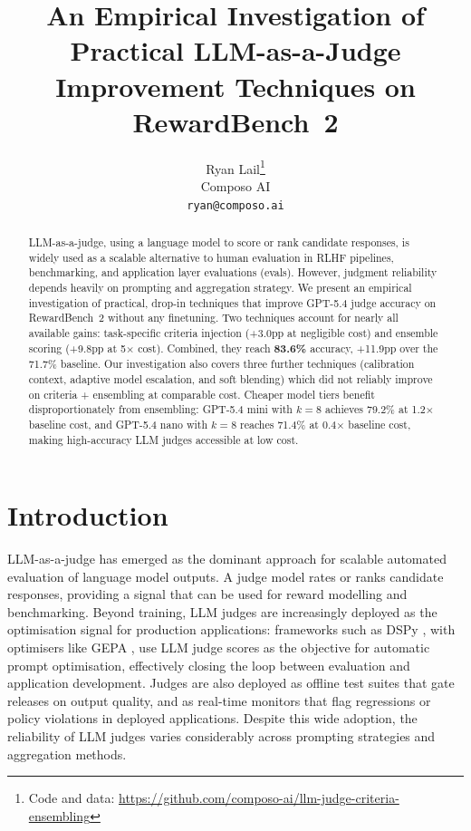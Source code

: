 \documentclass{article}
\title{An Empirical Investigation of Practical LLM-as-a-Judge Improvement Techniques on RewardBench~2}
\author{
  Ryan Lail\thanks{Code and data: \url{https://github.com/composo-ai/llm-judge-criteria-ensembling}} \\
  Composo AI \\
  \texttt{ryan@composo.ai}
}
\begin{document}
\maketitle

\begin{abstract}
LLM-as-a-judge, using a language model to score or rank candidate responses, is widely used as a scalable alternative to human evaluation in RLHF pipelines, benchmarking, and application layer evaluations (evals). However, judgment reliability depends heavily on prompting and aggregation strategy. We present an empirical investigation of practical, drop-in techniques that improve GPT-5.4 judge accuracy on RewardBench~2 without any finetuning. Two techniques account for nearly all available gains: task-specific criteria injection (+3.0pp at negligible cost) and ensemble scoring (+9.8pp at 5$\times$ cost). Combined, they reach \textbf{83.6\%} accuracy, +11.9pp over the 71.7\% baseline. Our investigation also covers three further techniques (calibration context, adaptive model escalation, and soft blending) which did not reliably improve on criteria + ensembling at comparable cost. Cheaper model tiers benefit disproportionately from ensembling: GPT-5.4 mini with $k{=}8$ achieves 79.2\% at 1.2$\times$ baseline cost, and GPT-5.4 nano with $k{=}8$ reaches 71.4\% at 0.4$\times$ baseline cost, making high-accuracy LLM judges accessible at low cost.
\end{abstract}

\section{Introduction}
\label{sec:introduction}

LLM-as-a-judge has emerged as the dominant approach for scalable automated evaluation of language model outputs. A judge model rates or ranks candidate responses, providing a signal that can be used for reward modelling and benchmarking. Beyond training, LLM judges are increasingly deployed as the optimisation signal for production applications: frameworks such as DSPy \citep{khattab2024dspy}, with optimisers like GEPA \citep{agrawal2026gepa}, use LLM judge scores as the objective for automatic prompt optimisation, effectively closing the loop between evaluation and application development. Judges are also deployed as offline test suites that gate releases on output quality, and as real-time monitors that flag regressions or policy violations in deployed applications. Despite this wide adoption, the reliability of LLM judges varies considerably across prompting strategies and aggregation methods.
\end{document}
